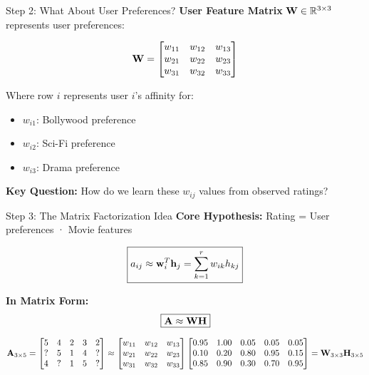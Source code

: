 \documentclass{beamer}
\begin{document}
\begin{frame}{Step 2: What About User Preferences?}
\textbf{User Feature Matrix} $\mathbf{W} \in \mathbb{R}^{3 \times 3}$ represents user preferences:

\pause
\begin{equation*}
\mathbf{W} = \begin{bmatrix}
w_{11} & w_{12} & w_{13} \\
w_{21} & w_{22} & w_{23} \\
w_{31} & w_{32} & w_{33}
\end{bmatrix}
\end{equation*}

\pause
Where row $i$ represents user $i$'s affinity for:
\begin{itemize}[<+->]
    \item $w_{i1}$: Bollywood preference
    \item $w_{i2}$: Sci-Fi preference  
    \item $w_{i3}$: Drama preference
\end{itemize}

\pause
\textbf{Key Question:} How do we learn these $w_{ij}$ values from observed ratings?
\end{frame}

\begin{frame}{Step 3: The Matrix Factorization Idea}
\textbf{Core Hypothesis:} Rating = User preferences · Movie features

\pause
\begin{equation*}
\boxed{a_{ij} \approx \mathbf{w}_i^T \mathbf{h}_j = \sum_{k=1}^r w_{ik} h_{kj}}
\end{equation*}

\pause
\textbf{In Matrix Form:}
\begin{equation*}
\boxed{\mathbf{A} \approx \mathbf{W} \mathbf{H}}
\end{equation*}

\pause
\begin{center}
$\mathbf{A}_{3 \times 5} =
\begin{bmatrix}
5 & 4 & 2 & 3 & 2 \\
? & 5 & 1 & 4 & ? \\
4 & ? & 1 & 5 & ? 
\end{bmatrix}
\approx
\begin{bmatrix}
w_{11} & w_{12} & w_{13} \\
w_{21} & w_{22} & w_{23} \\
w_{31} & w_{32} & w_{33}
\end{bmatrix}
\begin{bmatrix}
0.95 & 1.00 & 0.05 & 0.05 & 0.05 \\
0.10 & 0.20 & 0.80 & 0.95 & 0.15 \\
0.85 & 0.90 & 0.30 & 0.70 & 0.95
\end{bmatrix}
= \mathbf{W}_{3 \times 3} \mathbf{H}_{3 \times 5}$
\end{center}
\end{frame}
\end{document}
